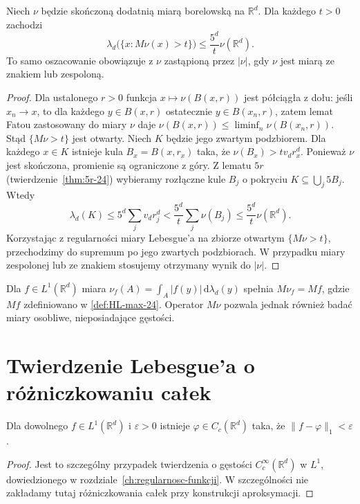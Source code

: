 \begin{twierdzenie}
\label{thm:weak-measure-25}
Niech $\nu$ będzie skończoną dodatnią miarą borelowską
na $\mathbb R^d$. Dla każdego $t>0$ zachodzi
\begin{equation}\label{eq:weak-measure-25}
 \lambda_d\bigl(\{x:M\nu(x)>t\}\bigr)
 \le \frac{5^d}{t}\nu(\mathbb R^d).
\end{equation}
To samo oszacowanie obowiązuje z $\nu$ zastąpioną przez
$|\nu|$, gdy $\nu$ jest miarą ze znakiem lub zespoloną.
\end{twierdzenie}
\begin{proof}
Dla ustalonego $r>0$ funkcja $x\mapsto\nu(B(x,r))$
jest półciągła z dołu: jeśli $x_n\to x$, to dla każdego
$y\in B(x,r)$ ostatecznie $y\in B(x_n,r)$, zatem lemat
Fatou zastosowany do miary $\nu$ daje
$\nu(B(x,r))\le\liminf_n\nu(B(x_n,r))$. Stąd
$\{M\nu>t\}$ jest otwarty. Niech $K$ będzie jego
zwartym podzbiorem. Dla każdego $x\in K$ istnieje
kula $B_x=B(x,r_x)$ taka, że
$\nu(B_x)>tv_dr_x^d$. Ponieważ $\nu$ jest skończona,
promienie są ograniczone z góry. Z lematu $5r$
(twierdzenie~\ref{thm:5r-24}) wybieramy rozłączne
kule $B_j$ o pokryciu $K\subseteq\bigcup_j5B_j$.
Wtedy
\[
\lambda_d(K)\le5^d\sum_jv_dr_j^d
 <\frac{5^d}{t}\sum_j\nu(B_j)
 \le\frac{5^d}{t}\nu(\mathbb R^d).
\]
Korzystając z regularności miary Lebesgue'a na zbiorze
otwartym $\{M\nu>t\}$, przechodzimy do supremum po
jego zwartych podzbiorach. W przypadku miary zespolonej
lub ze znakiem stosujemy otrzymany wynik do $|\nu|$.
\end{proof}

\begin{uwaga}
Dla $f\in L^1(\mathbb R^d)$ miara
$\nu_f(A)=\int_A|f(y)|\,\mathrm d\lambda_d(y)$ spełnia
$M\nu_f=Mf$, gdzie $Mf$ zdefiniowano w
\ref{def:HL-max-24}. Operator $M\nu$ pozwala jednak
również badać miary osobliwe, nieposiadające gęstości.
\end{uwaga}

\section{Twierdzenie Lebesgue'a o różniczkowaniu całek}
\begin{lemat}
\label{lem:continuous-dense-25}
Dla dowolnego $f\in L^1(\mathbb R^d)$ i
$\varepsilon>0$ istnieje $\varphi\in C_c(\mathbb R^d)$
taka, że $\|f-\varphi\|_1<\varepsilon$.
\end{lemat}
\begin{proof}
Jest to szczególny przypadek twierdzenia o gęstości
$C_c^\infty(\mathbb R^d)$ w $L^1$, dowiedzionego w
rozdziale~\ref{ch:regularnosc-funkcji}. W szczególności nie
zakładamy tutaj różniczkowania całek przy konstrukcji
aproksymacji.
\end{proof}


